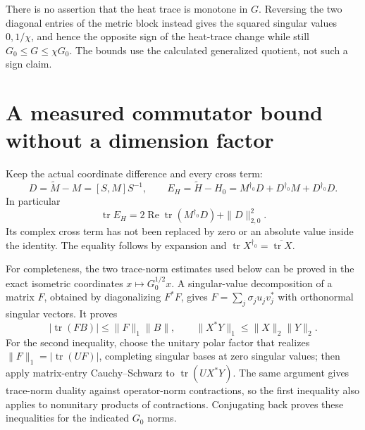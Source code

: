 \documentclass[11pt]{article}
\newcommand{\tr}{\operatorname{tr}}
\newcommand{\adjzero}{\dagger_0}
\newcommand{\Rea}{\operatorname{Re}}
\begin{document}
There is no assertion that the heat trace is monotone in \(G\). Reversing
the two diagonal entries of the metric block instead gives the squared
singular values \(0,1/\chi\), and hence the opposite sign of the
heat-trace change while still \(G_0\le G\le\chi G_0\).
The bounds use the calculated generalized quotient, not such a sign claim.

\section{A measured commutator bound without a dimension factor}

Keep the actual coordinate difference and every cross term:
\begin{equation}
 D=\widetilde M-M=[S,M]S^{-1},\qquad
 E_H=\widetilde H-H_0=M^{\adjzero}D+D^{\adjzero}M+D^{\adjzero}D.
 \tag{EM16}\label{EM16}
\end{equation}
In particular
\begin{equation}
 \tr E_H=2\Rea\tr(M^{\adjzero}D)+\|D\|_{2,0}^2.
 \tag{EM17}\label{EM17}
\end{equation}
Its complex cross term has not been replaced by zero or an absolute value
inside the identity. The equality follows by expansion and
\(\tr X^{\adjzero}=\overline{\tr X}\).

For completeness, the two trace-norm estimates used below can be proved
in the exact isometric coordinates \(x\mapsto G_0^{1/2}x\). A singular-value
decomposition of a matrix \(F\), obtained by diagonalizing \(F^*F\),
gives \(F=\sum_j\sigma_j u_jv_j^*\) with orthonormal singular vectors.
It proves
\[
 |\tr(FB)|\le\|F\|_1\|B\|,\qquad
 \|X^*Y\|_1\le\|X\|_2\|Y\|_2.
\]
For the second inequality, choose the unitary polar factor that realizes
\(\|F\|_1=|\tr(UF)|\), completing singular bases at zero singular values;
then apply matrix-entry Cauchy--Schwarz to
\(\tr(UX^*Y)\). The same argument gives trace-norm duality against
operator-norm contractions, so the first inequality also applies to
nonunitary products of contractions. Conjugating back proves these
inequalities for the indicated \(G_0\) norms.
\end{document}
